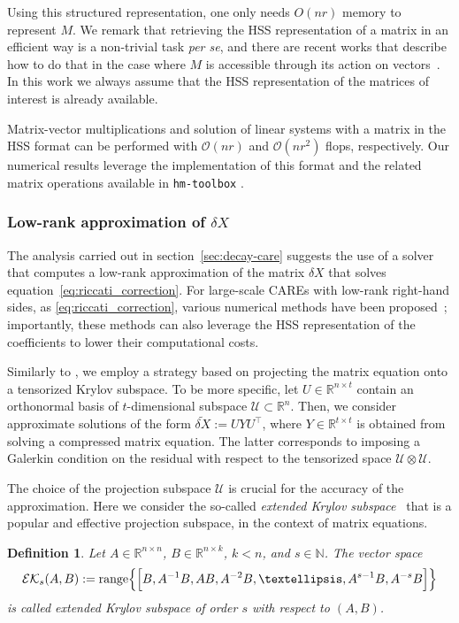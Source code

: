 \documentclass[a4paper,10pt]{article}
\newtheorem{definition}{Definition}[section]
\newcommand{\upd}[1]{{\color{black}#1}} %
\begin{document}
Using this structured representation, one only needs $O(nr)$ memory to represent $M$. We remark that retrieving the HSS representation of a matrix in an efficient way is a non-trivial task \emph{per se}, and there are recent works that describe how to do that in the case where $M$ is accessible through its action on vectors~\cite{halikias2024structured,levitt2024linear}. In this work we always assume that the HSS representation of the matrices of interest is already available. 

Matrix-vector multiplications and solution 
of linear systems with a matrix in the HSS format can be performed with $\mathcal O(nr)$ and 
$\mathcal O(nr^2)$ flops, respectively. Our numerical results leverage the implementation of this format and the related matrix operations 
available in \texttt{hm-toolbox} \cite{massei20}. 
\subsubsection{Low-rank approximation of $\delta X$}
The analysis carried out in section~\ref{sec:decay-care} suggests the use of a solver that computes a low-rank approximation of the matrix $\delta X$ that solves equation~\eqref{eq:riccati_correction}. For large-scale CAREs with low-rank right-hand sides, as \eqref{eq:riccati_correction},
various numerical methods have been proposed~\cite{benner20,simoncini14,simoncini16b,radi18}; importantly, these methods can also leverage the HSS representation of the coefficients to lower their computational costs. 

Similarly to \cite[Section 3.2]{kressner20}, we employ a strategy based on projecting the matrix equation onto a tensorized Krylov subspace. To be more specific, let $U\in\mathbb R^{n\times t}$ contain an orthonormal basis of $t$-dimensional subspace $\mathcal U\subset\mathbb R^n$. Then, we consider approximate solutions of the form $\widetilde {\delta X}:=UYU^\top$, where $Y\in\mathbb R^{t\times t}$ is obtained
from solving a compressed matrix equation. The latter corresponds to imposing a Galerkin condition on the residual with respect to the tensorized space  $\mathcal U\otimes\mathcal U$. 

The choice of the projection subspace $\mathcal U$ is crucial for the accuracy of the approximation.  Here we consider the so-called \emph{extended Krylov subspace}~\cite{simoncini07} that is a popular and effective projection subspace, in the context of matrix equations. 
\begin{definition} Let $A\in\mathbb R^{n\times n}$, $B \in\mathbb R^{n\times k}$, $k<n$, and $s\in\mathbb N$. The vector space 
	\begin{align*}
		\mathcal {EK}_\upd{s}(A,B):= \mathrm{range}\Big\{\Big[ B,A^{-1}B,AB, A^{-2}B,\ldots,A^{s-1}B, A^{-s}B\Big] \Big\}
	\end{align*}
	is called \emph{extended Krylov subspace} of order $s$ with respect to $(A,B)$.
\end{definition}
\end{document}

